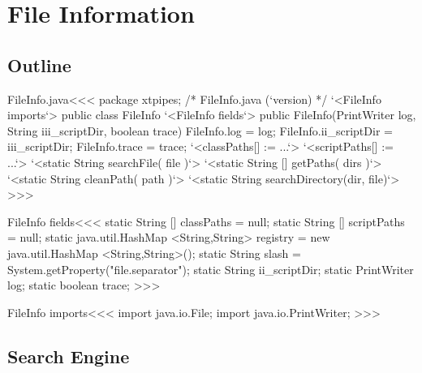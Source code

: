 \documentclass{article}
\begin{document}
\section{File Information}


\subsection{Outline}









\<FileInfo.java\><<<
package xtpipes;
/*
FileInfo.java (`version)
*/
`<FileInfo imports`>
public class FileInfo{
     `<FileInfo fields`>
   public FileInfo(PrintWriter log, String iii_scriptDir, boolean trace){
      FileInfo.log = log;
      FileInfo.ii_scriptDir = iii_scriptDir;
      FileInfo.trace = trace;
      `<classPaths[] := ...`>
      `<scriptPaths[] := ...`>
   }
   `<static String searchFile( file )`>
   `<static String [] getPaths( dirs )`>
   `<static String cleanPath( path )`>
   `<static String searchDirectory(dir, file)`>
}
>>>

\<FileInfo fields\><<<
static String [] classPaths = null;
static String [] scriptPaths = null;
static java.util.HashMap <String,String> registry = 
                                  new java.util.HashMap <String,String>();
static String slash = System.getProperty("file.separator");
static String ii_scriptDir;
static PrintWriter log;
static boolean trace;
>>>


\<FileInfo imports\><<<
import java.io.File;
import java.io.PrintWriter;
>>>

\subsection{Search Engine}
\end{document}

